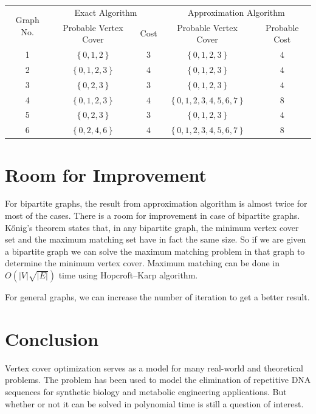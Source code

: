 \documentclass[12pt, a4paper]{article}
\begin{document}
	\begin{table}[h]
		\centering
		\begin{tabular}{|c|c|c|c|c|}
			\hline
			\multirow{2}{*}{Graph No.} & \multicolumn{2}{|c|}{Exact Algorithm} & \multicolumn{2}{|c|}{Approximation Algorithm}\\
			\cline{2-5}
			& Probable Vertex Cover & Cost & Probable Vertex Cover & Probable Cost\\
			\hline
			1 & $\left\{0,1,2\right\}$ & $3$ & $\left\{0,1,2,3\right\}$ & $4$\\
			\hline
			2 & $\left\{0,1,2,3\right\}$ & $4$ & $\left\{0,1,2,3\right\}$ & $4$\\
			\hline
			3 & $\left\{0,2,3\right\}$ & $3$ & $\left\{0,1,2,3\right\}$ & $4$\\
			\hline
			4 & $\left\{0,1,2,3\right\}$ & $4$ & $\left\{0,1,2,3,4,5,6,7\right\}$ & $8$\\
			\hline
			5 & $\left\{0,2,3\right\}$ & $3$ & $\left\{0,1,2,3\right\}$ & $4$\\
			\hline
			6 & $\left\{0,2,4,6\right\}$ & $4$ & $\left\{0,1,2,3,4,5,6,7\right\}$ & $8$\\
			\hline
		\end{tabular}
	\end{table}
	\pagebreak
	\section{Room for Improvement}
	For bipartite graphs, the result from approximation algorithm is almost twice for most of the cases. There is a room for improvement in case of bipartite graphs. Kőnig's theorem states that, in any bipartite graph, the minimum vertex cover set and the maximum matching set have in fact the same size. So if we are given a bipartite graph we can solve the maximum matching problem in that graph to determine the minimum vertex cover. Maximum matching can be done in $O\left(|V| \sqrt{|E|}\right)$ time using Hopcroft–Karp algorithm.
	
	For general graphs, we can increase the number of iteration to get a better result.
	\section{Conclusion}
	Vertex cover optimization serves as a model for many real-world and theoretical problems. The problem has been used to model the elimination of repetitive DNA sequences for synthetic biology and metabolic engineering applications. But whether or not it can be solved in polynomial time is still a question of interest.
\end{document}
